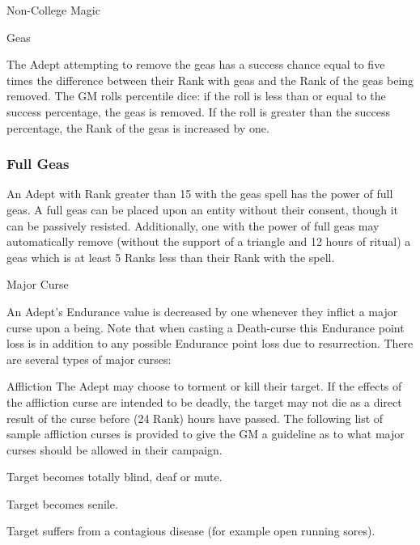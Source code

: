 \begin{Chapter}{Non-College Magic}
\begin{ritual}{Geas}
\begin{effects}
The Adept attempting to remove the geas has a success chance equal to
five times the difference between their Rank with geas and the Rank of
the geas being removed. The GM rolls percentile dice: if the roll is
less than or equal to the success percentage, the geas is removed.  If
the roll is greater than the success percentage, the Rank of the geas
is increased by one.

\subsubsection{Full Geas}

An Adept with Rank greater than 15 with the geas spell has the power
of full geas.  A full geas can be placed upon an entity without their
consent, though it can be passively resisted.  Additionally, one with
the power of full geas may automatically remove (without the support
of a triangle and 12 hours of ritual) a geas which is at least 5 Ranks
less than their Rank with the spell.
\end{effects}
\end{ritual}

\begin{ritual}{Major Curse}

\begin{effects}
An Adept’s Endurance value is decreased by one whenever they inflict a
major curse upon a being.  Note that when casting a Death-curse this
Endurance point loss is in addition to any possible Endurance point
loss due to resurrection. There are several types of major curses:

Affliction The Adept may choose to torment or kill their target. If
the effects of the affliction curse are intended to be deadly, the
target may not die as a direct result of the curse before (24 \mi Rank)
hours have passed. The following list of sample affliction curses is
provided to give the GM a guideline as to what major curses should be
allowed in their campaign.
\begin{Enumerate}
\item Target becomes totally blind, deaf or mute. 

\item Target becomes senile. 

\item Target suffers from a contagious disease (for example open
  running sores).


\end{Enumerate}
\end{effects}
\end{ritual}
\end{Chapter}
